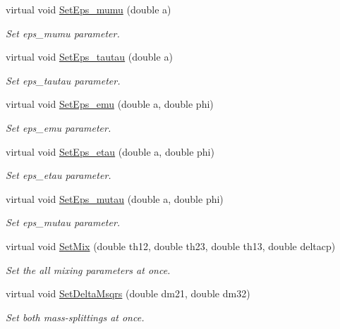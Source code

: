 \begin{DoxyCompactItemize}
virtual void \hyperlink{classOscProb_1_1PMNS__NSI_abf049db9904c745f04346d0d1dedf998}{Set\+Eps\+\_\+mumu} (double a)
\begin{DoxyCompactList}\small\item\em Set eps\+\_\+mumu parameter. \end{DoxyCompactList}\item 
virtual void \hyperlink{classOscProb_1_1PMNS__NSI_a5736f3cd792a621dfa844c3fa314cd17}{Set\+Eps\+\_\+tautau} (double a)
\begin{DoxyCompactList}\small\item\em Set eps\+\_\+tautau parameter. \end{DoxyCompactList}\item 
virtual void \hyperlink{classOscProb_1_1PMNS__NSI_ad5fccd151aea7c673c516b8686f8253c}{Set\+Eps\+\_\+emu} (double a, double phi)
\begin{DoxyCompactList}\small\item\em Set eps\+\_\+emu parameter. \end{DoxyCompactList}\item 
virtual void \hyperlink{classOscProb_1_1PMNS__NSI_a73d43e6d267975d1545af922f8e81bb3}{Set\+Eps\+\_\+etau} (double a, double phi)
\begin{DoxyCompactList}\small\item\em Set eps\+\_\+etau parameter. \end{DoxyCompactList}\item 
virtual void \hyperlink{classOscProb_1_1PMNS__NSI_acfb9893697e04fcc25915ffaf8ed137f}{Set\+Eps\+\_\+mutau} (double a, double phi)
\begin{DoxyCompactList}\small\item\em Set eps\+\_\+mutau parameter. \end{DoxyCompactList}\item 
virtual void \hyperlink{classOscProb_1_1PMNS__Fast_ad849b2231d99c5d66fb3ade8efb896e1}{Set\+Mix} (double th12, double th23, double th13, double deltacp)
\begin{DoxyCompactList}\small\item\em Set the all mixing parameters at once. \end{DoxyCompactList}\item 
virtual void \hyperlink{classOscProb_1_1PMNS__Fast_a63733b246e6d2e609ce3de7a65ba5b9f}{Set\+Delta\+Msqrs} (double dm21, double dm32)
\begin{DoxyCompactList}\small\item\em Set both mass-\/splittings at once. \end{DoxyCompactList}\item 

\end{DoxyCompactItemize}
